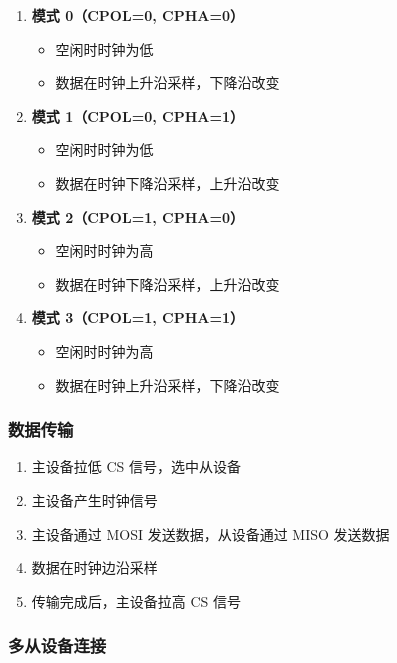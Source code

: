 \begin{enumerate}
  \item \textbf{模式 0（CPOL=0, CPHA=0）}
    \begin{itemize}
      \item 空闲时时钟为低
      \item 数据在时钟上升沿采样，下降沿改变
    \end{itemize}

  \item \textbf{模式 1（CPOL=0, CPHA=1）}
    \begin{itemize}
      \item 空闲时时钟为低
      \item 数据在时钟下降沿采样，上升沿改变
    \end{itemize}

  \item \textbf{模式 2（CPOL=1, CPHA=0）}
    \begin{itemize}
      \item 空闲时时钟为高
      \item 数据在时钟下降沿采样，上升沿改变
    \end{itemize}

  \item \textbf{模式 3（CPOL=1, CPHA=1）}
    \begin{itemize}
      \item 空闲时时钟为高
      \item 数据在时钟上升沿采样，下降沿改变
    \end{itemize}
\end{enumerate}

\subsubsection{数据传输}

\begin{enumerate}
  \item 主设备拉低 CS 信号，选中从设备
  \item 主设备产生时钟信号
  \item 主设备通过 MOSI 发送数据，从设备通过 MISO 发送数据
  \item 数据在时钟边沿采样
  \item 传输完成后，主设备拉高 CS 信号
\end{enumerate}

\subsubsection{多从设备连接}

